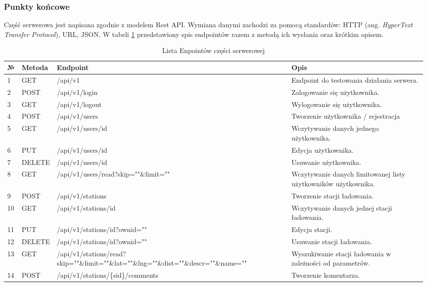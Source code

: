 \subsubsection{Punkty końcowe}
Część serwerowa jest napisana zgodnie z modelem Rest API. Wymiana danymi zachodzi za pomocą standardów: HTTP (ang. \textit{HyperText Transfer Protocol}), URL, JSON.
W tabeli \ref{tab:endpoints} przedstawiony spis endpointów razem z metodą ich wysłania oraz krótkim opisem.
\begin{table}[htb] \small
    \caption{Lista Enpointów części serwerowej}
    \label{tab:endpoints}
    \begin{tabularx}{\linewidth}{| m{0.45cm} | m{1.5cm} | m{6cm} | X |}
    \hline
    № & Metoda & Endpoint & Opis \\
    \hline
    1 & GET & /api/v1 & Endpoint do testowania działania serwera. \\
    \hline
    2 & POST & /api/v1/login & Zalogowanie się użytkownika. \\
    \hline
    3 & GET & /api/v1/logout & Wylogowanie się użytkownika. \\
    \hline
    4 & POST & /api/v1/users & Tworzenie użytkownika / rejestracja \\
    \hline
    5 & GET & /api/v1/users/{id} & Wczytywanie danych jednego użytkownika. \\
    \hline
    6 & PUT & /api/v1/users/{id} & Edycja użytkownika. \\
    \hline
    7 & DELETE & /api/v1/users/{id} & Usuwanie użytkownika. \\
    \hline
    8 & GET & /api/v1/users/read?skip=""\&limit="" & Wczytywanie danych limitowanej listy użytkowników użytkownika. \\
    \hline
    9 & POST & /api/v1/stations & Tworzenie stacji ładowania. \\
    \hline
    10 & GET & /api/v1/stations/{id} & Wczytywanie danych jednej stacji ładowania. \\
    \hline
    11 & PUT & /api/v1/stations/{id}?ownid="" & Edycja stacji. \\
    \hline
    12 & DELETE & /api/v1/stations/{id}?ownid="" & Usuwanie stacji ładowania. \\
    \hline
    13 & GET & /api/v1/stations/read?skip=""\&limit=""\&lat=""\&lng=""\&dist=""\&descr=""\&name="" & Wyszukiwanie stacji ładowania w zależności od parametrów. \\
    \hline
    14 & POST & /api/v1/stations/\{sid\}/comments & Tworzenie komentarza. \\

\end{tabularx}
\end{table}
